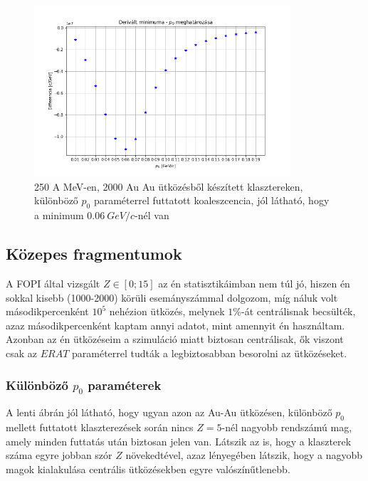 \documentclass[a4paper,12pt]{article}
\begin{document}
\begin{figure}[!htb]
\centering
\includegraphics[width=0.85\textwidth]{./legjobb_p0.png}
\caption{250 A MeV-en, 2000 Au Au ütközésből készített klasztereken, különböző $p_{0}$ paraméterrel futtatott koaleszcencia, jól látható, hogy a minimum $0.06 ~GeV/c$-nél van}
\end{figure}

\pagebreak

\subsection{Közepes fragmentumok}

\vspace{5mm}

\par A FOPI által vizsgált $Z \in [0;15]$ az én statisztikáimban nem túl jó, hiszen én sokkal kisebb (1000-2000) körüli esemányszámmal dolgozom, míg náluk volt másodikpercenként $10^{5}$ nehézion ütközés, melynek $1\%$-át centrálisnak becsülték, azaz másodikpercenként kaptam annyi adatot, mint amennyit én használtam. Azonban az én ütközéseim a szimuláció miatt biztosan centrálisak, ők viszont csak az $ERAT$ paraméterrel tudták a legbiztosabban besorolni az ütközéseket.

\vspace{5mm}

\subsubsection{ Különböző $p_{0}$ paraméterek}

\par A lenti ábrán jól látható, hogy ugyan azon az Au-Au ütközésen, különböző $p_{0}$ mellett futtatott klaszterezések során nincs $Z = 5$-nél nagyobb rendszámú mag, amely minden futtatás után biztosan jelen van. Látszik az is, hogy a klaszterek száma egyre jobban szór $Z$ növekedtével, azaz lényegében látszik, hogy a nagyobb magok kialakulása centrális ütközésekben egyre valószínűtlenebb.
\end{document}
